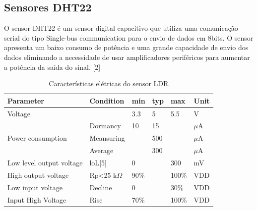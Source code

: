 \subsection{Sensores DHT22}

O sensor DHT22 é um sensor digital capacitivo que utiliza uma comunicação serial do tipo Single-bus communication para o envio de dados em 8bits. O sensor apresenta um baixo consumo de potência e uma grande capacidade de envio dos dados eliminando a necessidade de usar amplificadores periféricos para aumentar a potência da saída do sinal. [2]

\begin{table}[]
	\centering
	\caption{Características elétricas do sensor LDR}
	\label{caracteristicas}
	\begin{tabular}{|l|l|l|l|l|l|}
		\hline
		\textbf{Parameter}                 & \textbf{Condition}                                           & \textbf{min} & \textbf{typ} & \textbf{max} & \textbf{Unit} \\ \hline
		Voltage                            &                                                              & 3.3          & 5            & 5.5          & V             \\ \hline
		\multirow{3}{*}{Power consumption} & Dormancy                                                     & 10           & 15           &              & $\mu$A           \\ \cline{2-6} 
		& Meansuring                                                   &              & 500          &              & $\mu$A           \\ \cline{2-6} 
		& Average                                                      &              & 300          &              & $\mu$A           \\ \hline
		Low level output voltage           & loL{[}5{]}                                                   & 0            &              & 300          & mV            \\ \hline
		High output voltage                & Rp\textless{}25 k$\Omega$                                       & 90\%         &              & 100\%        & VDD           \\ \hline
		Low input voltage                  & Decline                                                      & 0            &              & 30\%         & VDD           \\ \hline
		Input High Voltage                 & Rise                                                         & 70\%         &              & 100\%        & VDD           \\ \hline

\end{tabular}
\end{table}
